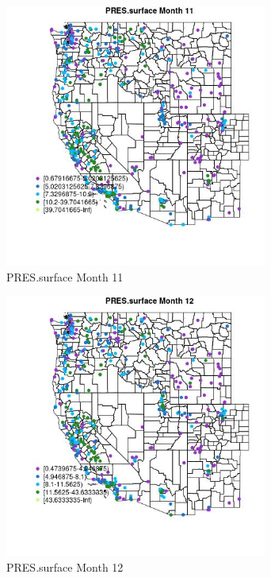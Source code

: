 \begin{figure} 
\centering  
\includegraphics[width=0.77\textwidth]{Code_Outputs/ML_input_report_ML_input_PM25_Step5_part_d_de_duplicated_aves_ML_input_MapObsMo11PRESsurface.jpg} 
\caption{\label{fig:ML_input_report_ML_input_PM25_Step5_part_d_de_duplicated_aves_ML_inputMapObsMo11PRESsurface}PRES.surface Month 11} 
\end{figure} 
 

\begin{figure} 
\centering  
\includegraphics[width=0.77\textwidth]{Code_Outputs/ML_input_report_ML_input_PM25_Step5_part_d_de_duplicated_aves_ML_input_MapObsMo12PRESsurface.jpg} 
\caption{\label{fig:ML_input_report_ML_input_PM25_Step5_part_d_de_duplicated_aves_ML_inputMapObsMo12PRESsurface}PRES.surface Month 12} 
\end{figure} 
 

